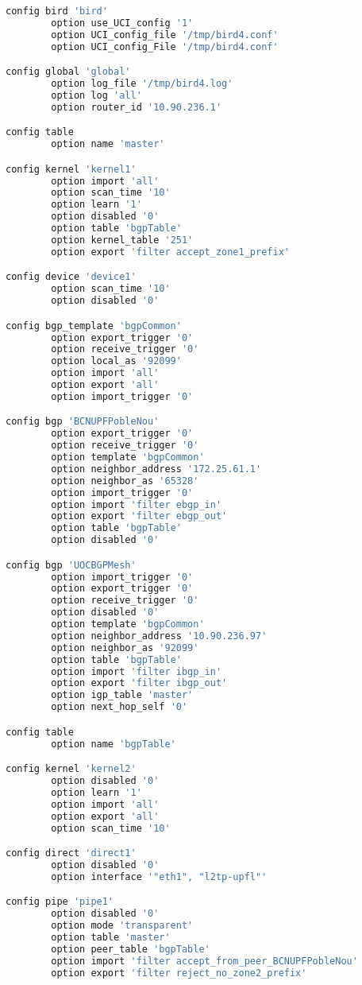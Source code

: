 \begin{lstlisting}[language=bash, caption={Bird UCI}]
config bird 'bird'
        option use_UCI_config '1'
        option UCI_config_file '/tmp/bird4.conf'
        option UCI_config_File '/tmp/bird4.conf'

config global 'global'
        option log_file '/tmp/bird4.log'
        option log 'all'
        option router_id '10.90.236.1'

config table
        option name 'master'

config kernel 'kernel1'
        option import 'all'
        option scan_time '10'
        option learn '1'
        option disabled '0'
        option table 'bgpTable'
        option kernel_table '251'
        option export 'filter accept_zone1_prefix'

config device 'device1'
        option scan_time '10'
        option disabled '0'

config bgp_template 'bgpCommon'
        option export_trigger '0'
        option receive_trigger '0'
        option local_as '92099'
        option import 'all'
        option export 'all'
        option import_trigger '0'

config bgp 'BCNUPFPobleNou'
        option export_trigger '0'
        option receive_trigger '0'
        option template 'bgpCommon'
        option neighbor_address '172.25.61.1'
        option neighbor_as '65328'
        option import_trigger '0'
        option import 'filter ebgp_in'
        option export 'filter ebgp_out'
        option table 'bgpTable'
        option disabled '0'

config bgp 'UOCBGPMesh'
        option import_trigger '0'
        option export_trigger '0'
        option receive_trigger '0'
        option disabled '0'
        option template 'bgpCommon'
        option neighbor_address '10.90.236.97'
        option neighbor_as '92099'
        option table 'bgpTable'
        option import 'filter ibgp_in'
        option export 'filter ibgp_out'
        option igp_table 'master'
        option next_hop_self '0'

config table
        option name 'bgpTable'

config kernel 'kernel2'
        option disabled '0'
        option learn '1'
        option import 'all'
        option export 'all'
        option scan_time '10'

config direct 'direct1'
        option disabled '0'
        option interface '"eth1", "l2tp-upfl"'

config pipe 'pipe1'
        option disabled '0'
        option mode 'transparent'
        option table 'master'
        option peer_table 'bgpTable'
        option import 'filter accept_from_peer_BCNUPFPobleNou'
        option export 'filter reject_no_zone2_prefix'
\end{lstlisting}
